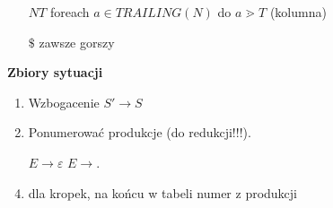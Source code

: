 \begin{multicols}{3}
\begin{enumerate}
      \item [$NT$] foreach $a \in TRAILING(N)$ do $a \gtrdot T$ (kolumna)
      \item [$\$$] zawsze gorszy
    \end{enumerate}
    \textbf{Zbiory sytuacji}
    \begin{enumerate}
      \item Wzbogacenie $ S' \rightarrow S$ 
      \item Ponumerować produkcje (do redukcji!!!).
      \item [$ E \rightarrow \varepsilon $] $E \rightarrow . $
      \item dla kropek, na końcu w tabeli numer z produkcji
    \end{enumerate}
    \end{multicols}
 